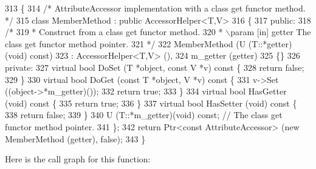 \begin{DoxyCode}
313 \{
314   \textcolor{comment}{/* AttributeAccessor implementation with a class get functor method. */}
315   \textcolor{keyword}{class }MemberMethod : \textcolor{keyword}{public} AccessorHelper<T,V>
316   \{
317 \textcolor{keyword}{public}:
318     \textcolor{comment}{/*}
319 \textcolor{comment}{     * Construct from a class get functor method.}
320 \textcolor{comment}{     * \(\backslash\)param [in] getter The class get functor method pointer.}
321 \textcolor{comment}{     */}
322     MemberMethod (U (T::*getter)(\textcolor{keywordtype}{void}) \textcolor{keyword}{const})
323       : AccessorHelper<T,V> (),
324         m\_getter (getter)
325     \{\}
326 \textcolor{keyword}{private}:
327     \textcolor{keyword}{virtual} \textcolor{keywordtype}{bool} DoSet (T *\textcolor{keywordtype}{object}, \textcolor{keyword}{const} V *v)\textcolor{keyword}{ const }\{
328       \textcolor{keywordflow}{return} \textcolor{keyword}{false};
329     \}
330     \textcolor{keyword}{virtual} \textcolor{keywordtype}{bool} DoGet (\textcolor{keyword}{const} T *\textcolor{keywordtype}{object}, V *v)\textcolor{keyword}{ const }\{
331       v->Set ((object->*m\_getter)());
332       \textcolor{keywordflow}{return} \textcolor{keyword}{true};
333     \}
334     \textcolor{keyword}{virtual} \textcolor{keywordtype}{bool} HasGetter (\textcolor{keywordtype}{void})\textcolor{keyword}{ const }\{
335       \textcolor{keywordflow}{return} \textcolor{keyword}{true};
336     \}
337     \textcolor{keyword}{virtual} \textcolor{keywordtype}{bool} HasSetter (\textcolor{keywordtype}{void})\textcolor{keyword}{ const }\{
338       \textcolor{keywordflow}{return} \textcolor{keyword}{false};
339     \}
340     U (T::*m\_getter)(void) \textcolor{keyword}{const};  \textcolor{comment}{// The class get functor method pointer.}
341   \};
342   \textcolor{keywordflow}{return} Ptr<const AttributeAccessor> (\textcolor{keyword}{new} MemberMethod (getter), \textcolor{keyword}{false});
343 \}
\end{DoxyCode}


Here is the call graph for this function\+:


